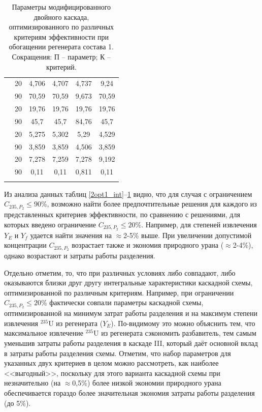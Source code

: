 {\begin{table}[ht]
\begin{tabular}{|r|r||c|c|c|c|}
        \Xhline{2\arrayrulewidth}
        \multirow{2}{*}{$C_{235,W_{2}}, \%$}
            & 20 & 4,706 & 4,707 & 4,737 & 9,24 \\\cline{2-6} 
            & 90 & 70,59 & 70,59 & 9,673 & 70,59\\
    \Xhline{2\arrayrulewidth}
        \multirow{2}{*}{$C_{235,P_{2}}, \%$}
            & 20 & 19,76 & 19,76 & 19,76 & 19,76 \\\cline{2-6} 
            & 90 & 45,7 & 45,7 & 84,76 & 45,7\\
        \Xhline{2\arrayrulewidth}
        \multirow{2}{*}{$C_{235,P_{n}}, \%$}
            & 20 & 5,275 & 5,302 & 5,29 & 4,529 \\\cline{2-6} 
            & 90 & 3,859 & 3,859 & 4,506 & 3,859\\
        \Xhline{2\arrayrulewidth}           
        \multirow{2}{*}{$P_2$, кг}
        & 20 & 7,278 & 7,259 & 7,278 & 9,192 \\\cline{2-6} 
        & 90 & 0,11 & 0,11 & 0,811 & 0,11\\
\Xhline{2\arrayrulewidth}
        \end{tabular}
        \caption{Параметры модифицированного двойного каскада, оптимизированного по различных критериям эффективности при обогащении регенерата состава 1. Сокращения: П -- параметр; К -- критерий.{\label{2opt1}}}
\end{table}


Из анализа данных таблиц \ref{2opt1_int}--\ref{2opt1} видно, что для случая с ограничением $C_{235,{P_2}} \leq 90\%$, возможно найти более предпочтительные решения для каждого из представленных критериев эффективности, по сравнению с решениями, для которых введено ограничение $C_{235,{P_2}} \leq 20\%$. Например, для степеней извлечения $Y_E$ и $Y_f$ удается найти значения на $\approx$2-5\% выше. При увеличении допустимой концентрации $C_{235,{P_2}}$ возрастает также и экономия природного урана ($\approx$2-4\%), однако возрастают и затраты работы разделения.

Отдельно отметим, то, что при различных условиях либо совпадают, либо оказываются близки друг другу интегральные характеристики каскадной схемы, оптимизированной по различным критериям. Например, при ограничении $C_{235,{P_2}} \leq 20\%$ фактически совпали параметры каскадной схемы, оптимизированной на минимум затрат работы разделения и на максимум степени извлечения $^{235}$U из регенерата ($Y_E$). По-видимому это можно объяснить тем, что максимальное извлечение $^{235}$U из регенерата сэкономить разбавитель, тем самым уменьшив затраты работы разделения в каскаде III, который даёт основной вклад в затраты работы разделения схемы. Отметим, что набор параметров для указанных двух критериев в целом можно рассмотреть, как наиболее <<выгодный>>, поскольку для этого варианта каскадной схемы при незначительно (на $\approx$0,5\%) более низкой экономии природного урана обеспечивается гораздо более значительная экономия затраты работы разделения (до 5\%). 

}
